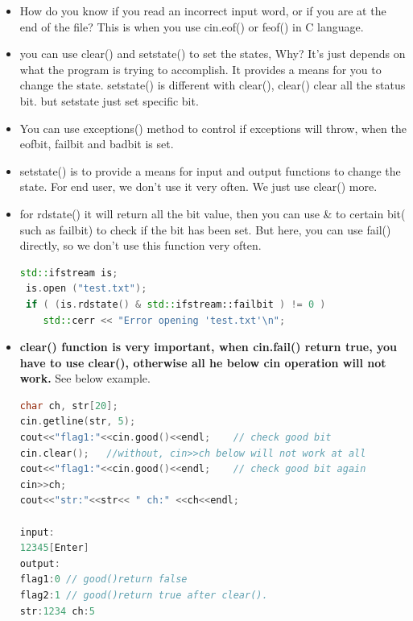 \documentclass[a4paper,12pt,twoside]{book}
\begin{document}
\begin{itemize}
\item How do you know if you read an incorrect input word, or if you are at the end of the file? This is when you use cin.eof() or feof() in C language.


\item you can use clear() and setstate() to set the states, Why? It's just depends on what the program is trying to accomplish.  It provides a means for you to change the state. setstate() is different with clear(), clear() clear all the status bit. but setstate just set specific bit.

\item You can use exceptions() method to control if exceptions will throw, when the eofbit, failbit and badbit is set.

\item setstate() is to provide a means for input and output functions to change the state. For end user, we don't use it very often. We just use clear() more.

 \item for rdstate() it will return all the bit value, then you can use \& to certain bit( such as failbit) to check if the bit has been set. But here, you can use fail() directly, so we don't use this function very often.
 \begin{lstlisting}[frame=single, language=c++]
std::ifstream is;
 is.open ("test.txt");
 if ( (is.rdstate() & std::ifstream::failbit ) != 0 )
    std::cerr << "Error opening 'test.txt'\n";
\end{lstlisting}


\item \textbf{clear() function is very important, when cin.fail() return true, you have to use clear(), otherwise all he below cin operation will not work.} See below example.

 \begin{lstlisting}[frame=single, language=c++]
char ch, str[20];
cin.getline(str, 5);
cout<<"flag1:"<<cin.good()<<endl;    // check good bit
cin.clear();   //without, cin>>ch below will not work at all
cout<<"flag1:"<<cin.good()<<endl;    // check good bit again
cin>>ch;
cout<<"str:"<<str<< " ch:" <<ch<<endl;

input:
12345[Enter]
output:
flag1:0 // good()return false
flag2:1 // good()return true after clear().
str:1234 ch:5
 \end{lstlisting}




\end{itemize}
\end{document}
